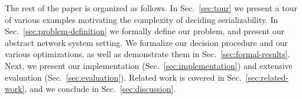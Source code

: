 The rest of the paper is organized as follows. In Sec.~\ref{sec:tour} we present a tour of various examples motivating the complexity of deciding serializability. In Sec.~\ref{sec:problem-definition} we formally define our problem, and present our abstract  network system setting. We formalize our decision procedure and our various optimizations, as well as demonstrate them in Sec.~\ref{sec:formal-results}. Next, we present our implementation (Sec.~\ref{sec:implementation}) and extensive evaluation (Sec.~\ref{sec:evaluation}). 
Related work is covered in Sec.~\ref{sec:related-work}, and we conclude in Sec.~\ref{sec:discussion}.






